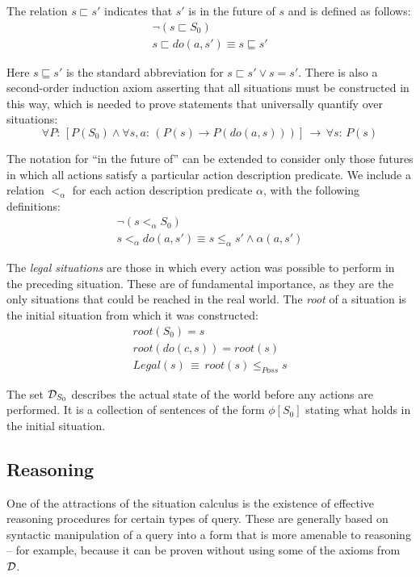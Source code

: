The relation $s\sqsubset s'$ indicates that $s'$ is in the future
of $s$ and is defined as follows:\begin{gather*}
\neg(s\sqsubset S_{0})\\
s\sqsubset do(a,s')\equiv s\sqsubseteq s'\end{gather*}


Here $s\sqsubseteq s'$ is the standard abbreviation for $s\sqsubset s'\vee s=s'$.
There is also a second-order induction axiom asserting that all situations
must be constructed in this way, which is needed to prove statements
that universally quantify over situations:\[
\forall P:\,\left[P(S_{0})\wedge\forall s,a:\,\left(P(s)\rightarrow P(do(a,s))\right)\right]\,\rightarrow\,\forall s:\, P(s)\]


The notation for {}``in the future of'' can be extended to consider
only those futures in which all actions satisfy a particular action
description predicate. We include a relation $<_{\alpha}$ for each
action description predicate $\alpha$, with the following definitions:\begin{gather*}
\neg\left(s<_{\alpha}S_{0}\right)\\
s<_{\alpha}do(a,s')\equiv s\leq_{\alpha}s'\wedge\alpha(a,s')\end{gather*}


The \emph{legal situations} are those in which every action was possible
to perform in the preceding situation. These are of fundamental importance,
as they are the only situations that could be reached in the real
world. The \emph{root} of a situation is the initial situation from
which it was constructed:\begin{gather*}
root(S_{0})=s\\
root(do(c,s))=root(s)\\
Legal(s)\,\equiv\, root(s)\leq_{Poss}s\end{gather*}


\medskip{}


The set $\mathcal{D}_{S_{0}}$ describes the actual state of the world before
any actions are performed. It is a collection of sentences of the
form $\phi[S_{0}]$ stating what holds in the initial situation.\medskip{}



\subsection{Reasoning}

One of the attractions of the situation calculus is the existence
of effective reasoning procedures for certain types of query. These
are generally based on syntactic manipulation of a query into a form
that is more amenable to reasoning -- for example, because it can
be proven without using some of the axioms from $\mathcal{D}$.


